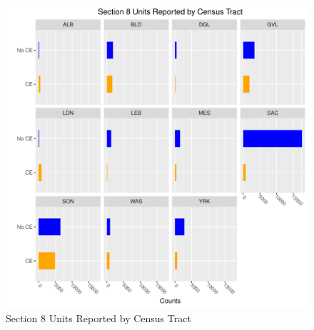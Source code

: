 \documentclass{article}\usepackage[]{graphicx}\usepackage[]{color}
\makeatletter
\def\maxwidth{ %
  \ifdim\Gin@nat@width>\linewidth
    \linewidth
  \else
    \Gin@nat@width
  \fi
}
\newenvironment{knitrout}{}{} %
\makeatother
\begin{document}
\begin{knitrout}
\color{fgcolor}\begin{figure}
\includegraphics[width=\maxwidth]{figure/MultiPlot_SEC_8_Counts-1} \caption[Section 8 Units Reported by Census Tract]{Section 8 Units Reported by Census Tract}\label{fig:MultiPlot_SEC_8_Counts}
\end{figure}


\end{knitrout}
\end{document}
